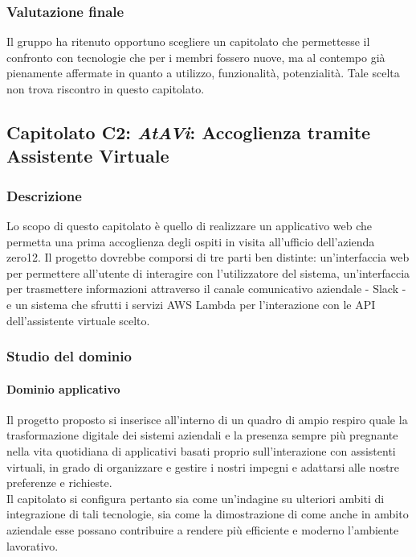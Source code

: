 		\subsubsection{Valutazione finale}
		Il gruppo \hx{} ha ritenuto opportuno scegliere un capitolato che permettesse il confronto con tecnologie che per i membri fossero nuove,
		ma al contempo già pienamente affermate in quanto a utilizzo, funzionalità, potenzialità. Tale scelta non trova riscontro in questo capitolato.
		
	\subsection{Capitolato C2: \emph{AtAVi}: Accoglienza tramite Assistente Virtuale}
		\subsubsection{Descrizione}
		Lo scopo di questo capitolato è quello di realizzare un applicativo web che permetta una prima accoglienza degli ospiti in visita all'ufficio 
		dell'azienda zero12. Il progetto dovrebbe comporsi di tre parti ben distinte: un'interfaccia web per permettere all'utente di interagire con 
		l'utilizzatore del sistema, un'interfaccia per trasmettere informazioni attraverso il canale comunicativo aziendale - Slack - e un sistema che 
		sfrutti i servizi AWS Lambda per l'interazione con le API dell'assistente virtuale scelto.
		\subsubsection{Studio del dominio}
			\paragraph{Dominio applicativo}
			Il progetto proposto si inserisce all'interno di un quadro di ampio respiro quale la trasformazione digitale dei sistemi aziendali e la 
			presenza sempre più pregnante nella vita quotidiana di applicativi basati proprio sull'interazione con assistenti virtuali, in grado di 
			organizzare e gestire i nostri impegni e adattarsi alle nostre preferenze e richieste.\\
			Il capitolato si configura pertanto sia come un'indagine su ulteriori ambiti di integrazione di tali tecnologie, sia come la dimostrazione 
			di come anche in ambito aziendale esse possano contribuire a rendere più efficiente e moderno l'ambiente lavorativo.
